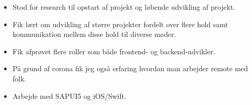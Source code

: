 \documentclass[10pt,a4paper,ragged2e,dvipsnames]{altacv}
\begin{document}

    \begin{fullwidth}
      \makecvheader
    \end{fullwidth}



    \begin{itemize}
      \item Stod for research til opstart af projekt og løbende udvikling af projekt.
      \item Fik lært om udvikling af større projekter fordelt over flere hold samt kommunikation mellem
        disse hold til diverse møder.
      \item Fik afprøvet flere roller som både frontend- og backend-udvikler.
      \item På grund af corona fik jeg også erfaring hvordan man arbejder remote med folk.
    \end{itemize}

    \divider

    \begin{itemize}
      \item Arbejde med SAPUI5 og iOS/Swift.
    \end{itemize}
\end{document}
